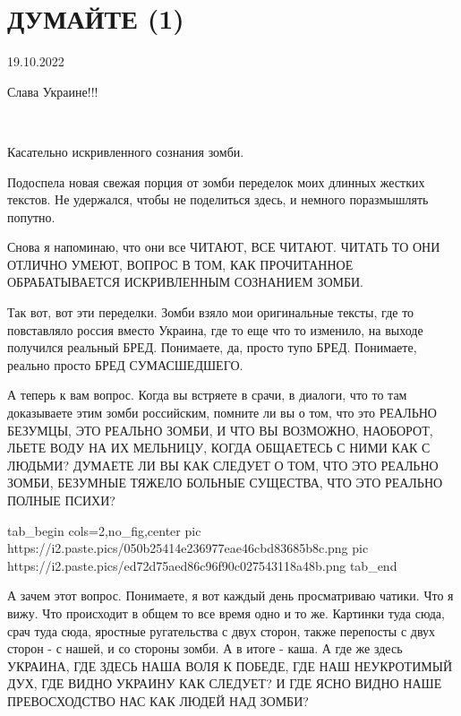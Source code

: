 
 
 
 
 

\section{ДУМАЙТЕ (1)}

19.10.2022

Слава Украине!!! 

💛 💙 💛 💙 💛 💙 💛 💙 💛 💙 💛 💙 💛 💛 💙 💛 💙 💛 💙 💛 💙 💛 💙 💛 💙 💛 💙                           

Касательно искривленного сознания зомби.

Подоспела новая свежая порция от зомби переделок моих длинных жестких текстов.
Не удержался, чтобы не поделиться здесь, и немного поразмышлять попутно. 

Снова я напоминаю, что они все ЧИТАЮТ, ВСЕ ЧИТАЮТ. ЧИТАТЬ ТО ОНИ ОТЛИЧНО УМЕЮТ,
ВОПРОС В ТОМ, КАК ПРОЧИТАННОЕ ОБРАБАТЫВАЕТСЯ ИСКРИВЛЕННЫМ СОЗНАНИЕМ ЗОМБИ.

Так вот, вот эти переделки. Зомби взяло мои оригинальные тексты, где то
повставляло россия вместо Украина, где то еще что то изменило, на выходе
получился реальный БРЕД. Понимаете, да, просто тупо БРЕД. Понимаете, реально
просто БРЕД СУМАСШЕДШЕГО.

А теперь к вам вопрос. Когда вы встряете в срачи, в диалоги, что то там
доказываете этим зомби российским, помните ли вы о том, что это РЕАЛЬНО
БЕЗУМЦЫ, ЭТО РЕАЛЬНО ЗОМБИ, И ЧТО ВЫ ВОЗМОЖНО, НАОБОРОТ, ЛЬЕТЕ ВОДУ НА ИХ
МЕЛЬНИЦУ, КОГДА ОБЩАЕТЕСЬ С НИМИ КАК С ЛЮДЬМИ? ДУМАЕТЕ ЛИ ВЫ КАК СЛЕДУЕТ О ТОМ,
ЧТО ЭТО РЕАЛЬНО ЗОМБИ, БЕЗУМНЫЕ ТЯЖЕЛО БОЛЬНЫЕ СУЩЕСТВА, ЧТО ЭТО РЕАЛЬНО ПОЛНЫЕ
ПСИХИ? 

\ifcmt
  tab_begin cols=2,no_fig,center
     pic https://i2.paste.pics/050b25414e236977eae46cbd83685b8c.png
		 pic https://i2.paste.pics/ed72d75aed86c96f90c027543118a48b.png
  tab_end
\fi

А зачем этот вопрос. Понимаете, я вот каждый день просматриваю чатики. Что я
вижу. Что происходит в общем то все время одно и то же. Картинки туда сюда,
срач туда сюда, яростные ругательства с двух сторон, также перепосты с двух
сторон - с нашей, и со стороны зомби. А в итоге - каша.  А где же здесь
УКРАИНА, ГДЕ ЗДЕСЬ НАША ВОЛЯ К ПОБЕДЕ, ГДЕ НАШ НЕУКРОТИМЫЙ ДУХ, ГДЕ ВИДНО
УКРАИНУ КАК СЛЕДУЕТ? И ГДЕ ЯСНО ВИДНО НАШЕ ПРЕВОСХОДСТВО НАС КАК ЛЮДЕЙ НАД
ЗОМБИ?

